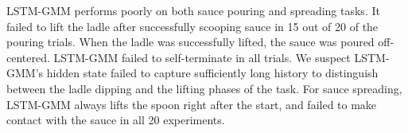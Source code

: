 LSTM-GMM performs poorly on both sauce pouring and spreading tasks. It failed to lift the ladle after successfully scooping sauce in 15 out of 20 of the pouring trials. When the ladle was successfully lifted, the sauce was poured off-centered. LSTM-GMM failed to self-terminate in all trials. We suspect LSTM-GMM's hidden state failed to capture sufficiently long history to distinguish between the ladle dipping and the lifting phases of the task. For sauce spreading, LSTM-GMM always lifts the spoon right after the start, and failed to make contact with the sauce in all 20 experiments. 
